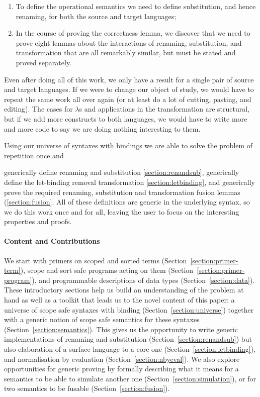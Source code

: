 \begin{enumerate}
\item To define the operational semantics we need to define
  substitution, and hence renaming, for both the source and target
  languages;
\item In the course of proving the correctness lemma, we discover that
  we need to prove eight lemmas about the interactions of renaming,
  substitution, and transformation that are all remarkably similar, but
  must be stated and proved separately. 
\end{enumerate}

Even after doing all of this work, we only have a result for a single
pair of source and target languages. If we were to change our object
of study, we would have to repeat the same work all over again (or at
least do a lot of cutting, pasting, and editing). The cases for
$\lambda$s and applications in the transformation are structural, but
if we add more constructs to both languages, we would have to write
more and more code to say we are doing nothing interesting to them.

Using our universe of syntaxes with bindings we are able to solve the
problem of repetition once and 


generically define renaming and substitution \ref{section:renandsub},
generically define the let-binding removal transformation
\ref{section:letbinding}, and generically prove the required renaming,
substitution and transformation fusion lemmas (\ref{section:fusion}. All of these
definitions are generic in the underlying syntax, so we do this work
once and for all, leaving the user to focus on the interesting
properties and proofs.

\paragraph{Content and Contributions}
We start with primers on scoped and sorted terms
(Section~\ref{section:primer-term}), scope and sort safe programs
acting on them (Section~\ref{section:primer-program}), and
programmable descriptions of data types (Section~\ref{section:data}).
These introductory sections help us build an understanding of the
problem at hand as well as a toolkit that leads us to the novel
content of this paper: a universe of scope safe syntaxes with binding
(Section~\ref{section:universe}) together with a generic notion of
scope safe semantics for these syntaxes
(Section~\ref{section:semantics}).  This gives us the opportunity to
write generic implementations of renaming and substitution
(Section~\ref{section:renandsub}) but also elaboration of a surface
language to a core one (Section~\ref{section:letbinding}), and
normalisation by evaluation (Section~\ref{section:nbyeval}). We also
explore opportunities for generic proving by formally describing what
it means for a semantics to be able to simulate another one
(Section~\ref{section:simulation}), or for two semantics to be fusable
(Section~\ref{section:fusion}).

